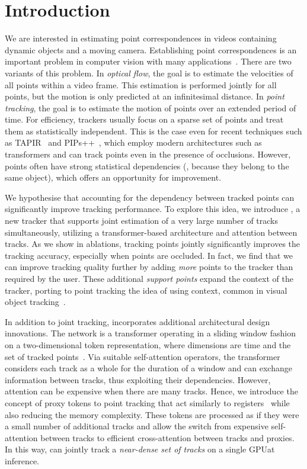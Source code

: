 \section{Introduction}%
\label{sec:intro}

We are interested in estimating point correspondences in videos containing dynamic objects and a moving camera.
Establishing point correspondences is an important problem in computer vision with many applications~\cite{agarwal2011building, teed2021droid, jiang2018super, yang2022banmo}.
There are two variants of this problem.
In \emph{optical flow}, the goal is to estimate the velocities of all points within a video frame.
This estimation is performed jointly for all points, but the motion is only predicted at an infinitesimal distance.
In \emph{point tracking}, the goal is to estimate the motion of points over an extended period of time.
For efficiency, trackers usually focus on a sparse set of points and treat them as statistically independent.
This is the case even for recent techniques such as TAPIR~\cite{doersch2023tapir} and PIPs++~\cite{zheng2023pointodyssey}, which employ modern architectures such as transformers and can track points even in the presence of occlusions.
However, points often have strong statistical dependencies (\eg, because they belong to the same object), which offers an opportunity for improvement.

We hypothesise that accounting for the dependency between tracked points can significantly improve tracking performance.
To explore this idea, we introduce \method, a new tracker that supports joint estimation of a very large number of tracks simultaneously, utilizing a transformer-based architecture and attention between tracks.
As we show in ablations, tracking points jointly significantly improves the tracking accuracy, especially when points are occluded.
In fact, we find that we can improve tracking quality further by adding \emph{more} points to the tracker than required by the user.
These additional \emph{support points} expand the context of the tracker, porting to point tracking the idea of using context, common in visual object tracking~\cite{jia2012visual, li2015reliable, song2017crest}.

In addition to joint tracking, \method incorporates additional architectural design innovations.
The network is a transformer operating in a sliding window fashion on a two-dimensional token representation, where dimensions are time and the set of tracked points~\cite{gberta_2021_ICML}.
Via suitable self-attention operators, the transformer considers each track as a whole for the duration of a window and can exchange information between tracks, thus exploiting their dependencies.
However, attention can be expensive when there are many tracks.
Hence, we introduce the concept of proxy tokens to point tracking that act similarly to registers~\cite{darcet2023vision, jaegle22perceiver, nagrani2021attention} while also reducing the memory complexity.
These tokens are processed as if they were a small number of additional tracks and allow the switch from expensive self-attention between tracks to efficient cross-attention between tracks and proxies.
In this way, \method can jointly track a \emph{near-dense set of tracks} on a single GPU\@ at inference.

